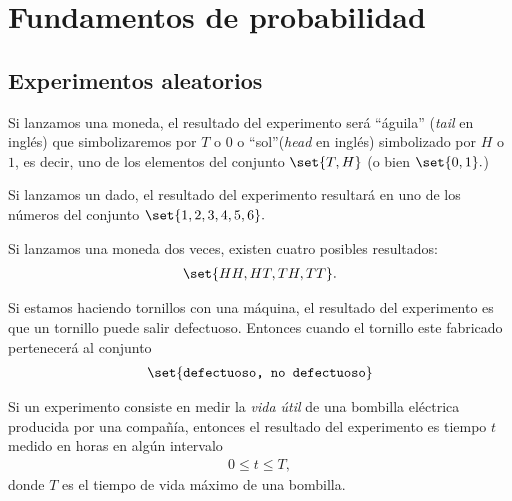 
\section{Fundamentos de probabilidad}

\subsection{Experimentos aleatorios}

 \begin{exmp}
  \label{exmp:1.1}
  Si lanzamos una moneda, el resultado del experimento será ``águila'' (\emph{tail} en inglés) que simbolizaremos por $T$ o $0$ o ``sol''(\emph{head} en inglés) simbolizado por $H$ o $1$, es decir, uno de los elementos del conjunto $\set{T,H}$ (o bien $\set{0,1}.$)
 \end{exmp}



 \begin{exmp}
  \label{exmp:1.2}
  Si lanzamos un dado, el resultado del experimento resultará en uno de los números del conjunto $\set{1,2,3,4,5,6}.$
 \end{exmp}



 \begin{exmp}
  \label{exmp:1.3}
  Si lanzamos una moneda dos veces, existen cuatro posibles resultados:
  \begin{align*}
   \set{HH,HT,TH,TT}.
  \end{align*}

 \end{exmp}



 \begin{exmp}
  \label{exmp:1.4}
  Si estamos haciendo tornillos con una máquina, el resultado del experimento es que un tornillo puede salir defectuoso. Entonces cuando el tornillo este fabricado pertenecerá al conjunto
  \begin{align*}
   \set{\texttt{defectuoso, no defectuoso}}
  \end{align*}

 \end{exmp}



 \begin{exmp}
  \label{exmp:1.5}
  Si un experimento consiste en medir la \emph{vida útil} de una bombilla eléctrica producida por una compa\~nía, entonces el resultado del experimento es tiempo $t$ medido en horas en algún intervalo
  \begin{align*}
   0\leq t \leq T,
  \end{align*}
donde $T$ es el tiempo de vida máximo de una bombilla.
 \end{exmp}



